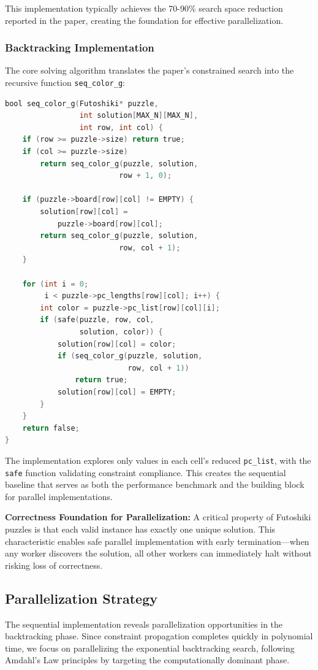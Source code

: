 This implementation typically achieves the 70-90\% search space reduction reported in the paper, creating the foundation for effective parallelization.

\subsubsection{Backtracking Implementation}
\label{subsubsec:backtrack}
The core solving algorithm translates the paper's constrained search into the recursive function \texttt{seq\_color\_g}:

\begin{lstlisting}[language=C, caption=Sequential backtracking implementation, label={listing:seq_implementation}]
bool seq_color_g(Futoshiki* puzzle, 
                 int solution[MAX_N][MAX_N], 
                 int row, int col) {
    if (row >= puzzle->size) return true;
    if (col >= puzzle->size) 
        return seq_color_g(puzzle, solution, 
                          row + 1, 0);
    
    if (puzzle->board[row][col] != EMPTY) {
        solution[row][col] = 
            puzzle->board[row][col];
        return seq_color_g(puzzle, solution, 
                          row, col + 1);
    }
    
    for (int i = 0; 
         i < puzzle->pc_lengths[row][col]; i++) {
        int color = puzzle->pc_list[row][col][i];
        if (safe(puzzle, row, col, 
                 solution, color)) {
            solution[row][col] = color;
            if (seq_color_g(puzzle, solution, 
                            row, col + 1))
                return true;
            solution[row][col] = EMPTY;
        }
    }
    return false;
}
\end{lstlisting}

The implementation explores only values in each cell's reduced \texttt{pc\_list}, with the \texttt{safe} function validating constraint compliance. This creates the sequential baseline that serves as both the performance benchmark and the building block for parallel implementations.

\textbf{Correctness Foundation for Parallelization:} A critical property of Futoshiki puzzles is that each valid instance has exactly one unique solution. This characteristic enables safe parallel implementation with early termination—when any worker discovers the solution, all other workers can immediately halt without risking loss of correctness.

\subsection{Parallelization Strategy}
\label{subsec:parallel_implementation}
The sequential implementation reveals parallelization opportunities in the backtracking phase. Since constraint propagation completes quickly in polynomial time, we focus on parallelizing the exponential backtracking search, following Amdahl's Law principles \cite{ahmdals_law} by targeting the computationally dominant phase.


